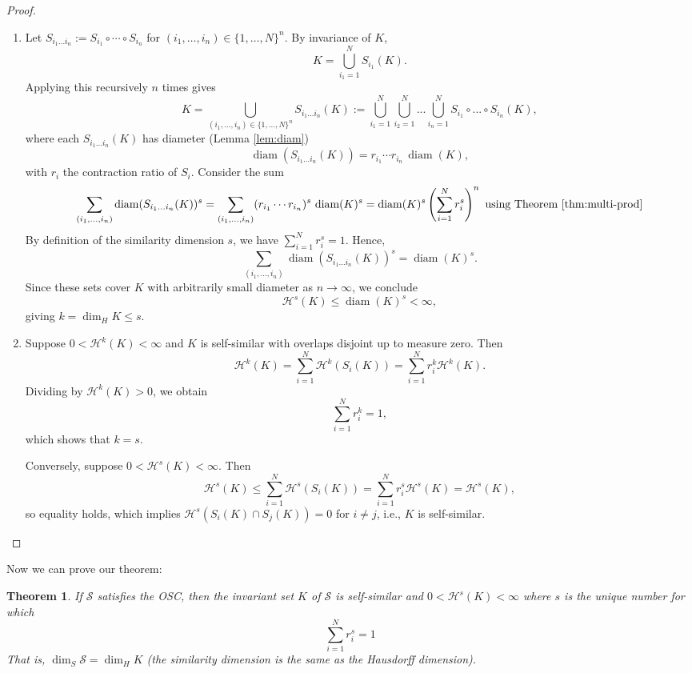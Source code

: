 \documentclass{article}
\theoremstyle{plain}
\newtheorem{thm}{Theorem}[section]
\theoremstyle{definition}
\DeclareMathOperator{\diam}{diam}
\theoremstyle{remark}
\begin{document}
\begin{proof}~\\
\begin{enumerate}
    \item Let $S_{i_1 \dots i_n} := S_{i_1} \circ \cdots \circ S_{i_n}$ for $(i_1,\dots,i_n) \in \{1,\dots,N\}^n$. By invariance of $K$,
    \[
        K = \bigcup_{i_1=1}^N S_{i_1}(K).
    \]
    Applying this recursively $n$ times gives
    \[
        K = \bigcup_{(i_1,\dots,i_n) \in \{1,\dots,N\}^n} S_{i_1\dots i_n}(K) := \bigcup \limits _{i_1 = 1}^N \bigcup \limits _{i_2 = 1} ^ N ... \bigcup \limits _{i_n = 1}^N S_{i_1} \circ ... \circ S_{i_n} (K),
    \]
    where each $S_{i_1\dots i_n}(K)$ has diameter (Lemma \ref{lem:diam})
    \[
        \diam(S_{i_1\dots i_n}(K)) = r_{i_1} \cdots r_{i_n} \, \diam(K),
    \]
    with $r_i$ the contraction ratio of $S_i$. Consider the sum
    \[
        \sum_{(i_1,\dots,i_n)} \diam(S_{i_1\dots i_n}(K))^s
        = \sum_{(i_1,\dots,i_n)} (r_{i_1} \cdots r_{i_n})^s \, \diam(K)^s
        = \diam(K)^s \left( \sum_{i=1}^N r_i^s \right)^n \text{ using Theorem }\ref{thm:multi-prod}
    \]
    By definition of the similarity dimension $s$, we have $\sum_{i=1}^N r_i^s = 1$. Hence,
    \[
        \sum_{(i_1,\dots,i_n)} \diam(S_{i_1\dots i_n}(K))^s = \diam(K)^s.
    \]
    Since these sets cover $K$ with arbitrarily small diameter as $n \to \infty$, we conclude
    \[
        \mathcal{H}^s(K) \le \diam(K)^s < \infty,
    \]
    giving $k = \dim_H K \le s$.

    \item Suppose $0 < \mathcal{H}^k(K) < \infty$ and $K$ is self-similar with overlaps disjoint up to measure zero. Then
    \[
        \mathcal{H}^k(K) = \sum_{i=1}^N \mathcal{H}^k(S_i(K)) = \sum_{i=1}^N r_i^k \mathcal{H}^k(K).
    \]
    Dividing by $\mathcal{H}^k(K) > 0$, we obtain
    \[
        \sum_{i=1}^N r_i^k = 1,
    \]
    which shows that $k = s$.

    Conversely, suppose $0 < \mathcal{H}^s(K) < \infty$. Then
    \[
        \mathcal{H}^s(K) \le \sum_{i=1}^N \mathcal{H}^s(S_i(K)) = \sum_{i=1}^N r_i^s \mathcal{H}^s(K) = \mathcal{H}^s(K),
    \]
    so equality holds, which implies
    \(\mathcal{H}^s(S_i(K) \cap S_j(K)) = 0\) for $i \ne j$, i.e., $K$ is self-similar.
\end{enumerate}
\end{proof}




Now we can prove our theorem:

\begin{thm}
    If $\mathcal{S}$ satisfies the OSC, then the invariant set $K$ of $\mathcal{S}$ is self-similar and $0 < \mathcal{H}^s(K)<\infty$ where $s$ is the unique number for which \[
    \sum \limits _{i=1}^N r_i^s = 1
    \]
    That is, $\dim _S \mathcal{S} = \dim _H K$ (the similarity dimension is the same as the Hausdorff dimension).
\end{thm}
\end{document}
